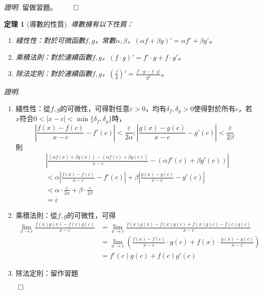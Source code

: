 \documentclass[12pt]{article}
\newtheorem*{theorem}{定理}
\renewenvironment*{proof}{\textit{證明.}}{\hfill$\qed$}
\begin{document}
    \begin{proof}
        留做習題。
    \end{proof}

    \begin{theorem}[導數的性質]
        導數擁有以下性質：\begin{enumerate}
            \item 綫性性：對於可微函數$f,g$，常數$\alpha,\beta$，$(\alpha f+\beta g)'=\alpha f' + \beta g'$。
            \item 乘積法則：對於連續函數$f,g$，$(f\cdot g)'=f'\cdot g + f\cdot g'$。
            \item 除法定則：對於連續函數$f,g$，$(\frac{f}{g})'=\frac{f'\cdot g-f\cdot g'}{g^2}$。
        \end{enumerate}
    \end{theorem}

    \begin{proof}
        \begin{enumerate}
            \item 綫性性：從$f,g$的可微性，可得對任意$\varepsilon>0$，均有$\delta_f,\delta_g>0$使得對於所有$c$，若$x$符合$0<|x-c|<\min\{\delta_f,\delta_g\}$時，$$|\frac{f(x)-f(c)}{x-c}-f'(c)|<\frac{\varepsilon}{2\alpha};|\frac{g(x)-g(c)}{x-c}-g'(c)|<\frac{\varepsilon}{2\beta}$$
            則\begin{align*}
                &|\frac{(\alpha f(x)+\beta g(x))-(\alpha f(c)+\beta g(c))}{x-c}-(\alpha f'(c)+\beta g'(c))|\\
                &<\alpha|\frac{f(x)-f(c)}{x-c}-f'(c)|+\beta|\frac{g(x)-g(c)}{x-c}-g'(c)|\\
                &<\alpha\cdot\frac{\varepsilon}{2\alpha}+\beta\cdot\frac{\varepsilon}{2\beta}\\
                &=\varepsilon
            \end{align*}
            \item 乘積法則：從$f,g$的可微性，可得
            \begin{align*}
                \lim_{x\to c}\frac{f(x)g(x)-f(c)g(c)}{x-c} &= \lim_{x\to c}\frac{f(x)g(x)-f(x)g(c)+f(x)g(c)-f(c)g(c)}{x-c}\\
                &=\lim_{x\to c}(\frac{f(x)-f(c)}{x-c}\cdot g(c)+f(x)\cdot \frac{g(x)-g(c)}{x-c})\\
                &=f'(c)g(c)+f(c)g'(c)
            \end{align*}
            \item 除法定則：留作習題
        \end{enumerate}
    \end{proof}
\end{document}
